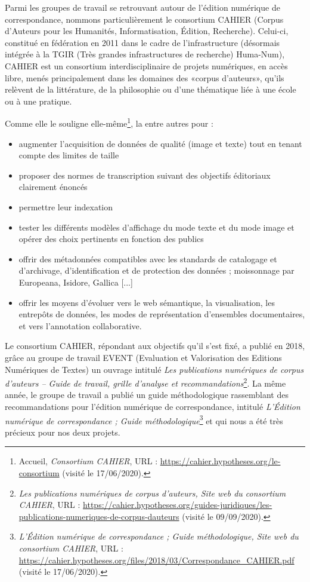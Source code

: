 Parmi les groupes de travail se retrouvant autour de l’édition numérique de correspondance, nommons particulièrement le consortium CAHIER (Corpus d’Auteurs pour les Humanités, Informatisation, Édition, Recherche). Celui-ci, constitué en fédération en 2011 dans le cadre de l’infrastructure  (désormais intégrée à la TGIR (Très grandes infrastructures de recherche) Huma-Num), CAHIER est un consortium interdisciplinaire de projets numériques, en accès libre, menés principalement dans les domaines des «corpus d’auteurs», qu’ils relèvent de la littérature, de la philosophie ou d’une thématique liée à une école ou à une pratique.

Comme elle le souligne elle-même\footnote{Accueil, \emph{Consortium CAHIER}, URL : \url{https://cahier.hypotheses.org/le-consortium} (visité le 17/06/2020).}, la
     entre autres pour :
\begin{itemize}
    \item augmenter l’acquisition de données de qualité (image et texte) tout en tenant compte des limites de taille
    \item proposer des normes de transcription suivant des objectifs éditoriaux clairement énoncés
    \item permettre leur indexation
    \item tester les différents modèles d’affichage du mode texte et du mode image et opérer des choix pertinents en fonction des publics
    \item offrir des métadonnées compatibles avec les standards de catalogage et d’archivage, d’identification et de protection des données ; moissonnage par Europeana, Isidore, Gallica [...]
    \item  offrir les moyens d’évoluer vers le web sémantique, la visualisation, les entrepôts de données, les modes de représentation d’ensembles documentaires, et vers l’annotation collaborative.
    \end{itemize}


Le consortium CAHIER, répondant aux objectifs qu'il s'est fixé, a publié en 2018, grâce au groupe de travail EVENT (Evaluation et Valorisation des Editions Numériques de Textes) un ouvrage intitulé \emph{Les publications numériques de corpus d’auteurs – Guide de travail, grille d’analyse et recommandations}\footnote{\emph{Les publications numériques de corpus d’auteurs, Site web du consortium CAHIER}, URL : \url{https://cahier.hypotheses.org/guides-juridiques/les-publications-numeriques-de-corpus-dauteurs} (visité le 09/09/2020).}. La même année, le groupe de travail  a publié un guide méthodologique rassemblant des recommandations pour l’édition numérique de correspondance, intitulé \emph{L’Édition numérique de correspondance ; Guide méthodologique}\footnote{\emph{L’Édition numérique de correspondance ; Guide méthodologique, Site web du consortium CAHIER}, URL : \url{https://cahier.hypotheses.org/files/2018/03/Correspondance_CAHIER.pdf} (visité le 17/06/2020).} et qui nous a été très précieux pour nos deux projets.\\

